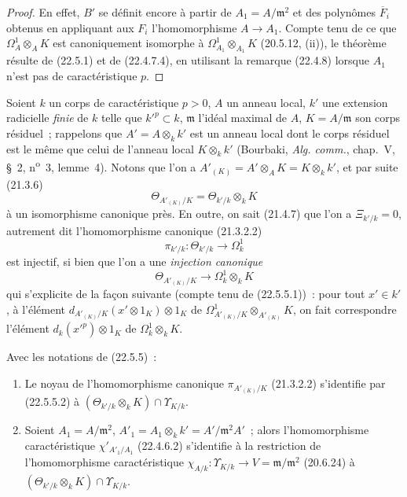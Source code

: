 \begin{proof}
En effet, $B'$ se définit encore à partir de $A_1=A/\mathfrak m^2$ et des
polynômes $\overline F_i$ obtenus en appliquant aux $F_i$ l'homomorphisme
$A\longrightarrow A_1$. Compte tenu de ce que $\Omega^1_A\otimes_AK$ est
canoniquement isomorphe à $\Omega^1_{A_1}\otimes_{A_1}K$ (20.5.12, (ii)), le
théorème résulte de (22.5.1) et de (22.4.7.4), en utilisant la remarque
(22.4.8) lorsque $A_1$ n'est pas de caractéristique $p$.
\end{proof}


\begin{env}[22.5.5]
\label{0.22.5.5-fr}
Soient $k$ un corps de caractéristique $p>0$, $A$ un anneau local, $k'$ une
extension radicielle \emph{finie} de $k$ telle que $k'^p\subset k$,
$\mathfrak m$ l'idéal maximal de $A$, $K=A/\mathfrak m$ son corps résiduel~;
rappelons que $A'=A\otimes_kk'$ est un anneau local dont le corps résiduel est
le même que celui de l'anneau local $K\otimes_kk'$ (Bourbaki,
\emph{Alg. comm.}, chap.~V, §~2, n\textsuperscript{o}~3, lemme~4). Notons que
l'on a $A'_{(K)}=A'\otimes_AK=K\otimes_kk'$, et par suite (21.3.6)
\begin{equation}
\label{0.22.5.5.1-fr}
  \Theta_{A'_{(K)}/K}=\Theta_{k'/k}\otimes_kK
  \tag{22.5.5.1}
\end{equation}
à un isomorphisme canonique près. En outre, on sait (21.4.7) que l'on a
$\Xi_{k'/k}=0$, autrement dit l'homomorphisme canonique (21.3.2.2)
\[
  \pi_{k'/k}:\Theta_{k'/k}\longrightarrow\Omega^1_k
\]
est injectif, si bien que l'on a une \emph{injection canonique}
\begin{equation}
\label{0.22.5.5.2-fr}
  \Theta_{A'_{(K)}/K}\longrightarrow\Omega^1_k\otimes_kK
  \tag{22.5.5.2}
\end{equation}
qui s'explicite de la façon suivante (compte tenu de (22.5.5.1))~: pour tout
$x'\in k'$, à l'élément
$d_{A'_{(K)}/K}(x'\otimes1_K)\otimes1_K$ de
$\Omega^1_{A'_{(K)}/K}\otimes_{A'_{(K)}}K$, on fait correspondre l'élément
$d_k(x'^p)\otimes1_K$ de $\Omega^1_k\otimes_kK$.
\end{env}

\begin{lemma}[22.5.6]
\label{0.22.5.6-fr}
Avec les notations de \textup{(22.5.5)}~:
\begin{enumerate}
  \item[\rm(i)] Le noyau de l'homomorphisme canonique
  $\pi_{A'_{(K)}/K}$ \textup{(21.3.2.2)} s'identifie par \textup{(22.5.5.2)} à
  $(\Theta_{k'/k}\otimes_kK)\cap\Upsilon_{K/k}$.
  \item[\rm(ii)] Soient $A_1=A/\mathfrak m^2$,
  $A'_1=A_1\otimes_kk'=A'/\mathfrak m^2A'$~; alors l'homomorphisme
  caractéristique $\chi'_{A'_1/A_1}$ \textup{(22.4.6.2)} s'identifie à la restriction de
  l'homomorphisme caractéristique
  $\chi_{A/k}:\Upsilon_{K/k}\longrightarrow V=\mathfrak m/\mathfrak m^2$
  \textup{(20.6.24)} à $(\Theta_{k'/k}\otimes_kK)\cap\Upsilon_{K/k}$.
\end{enumerate}
\end{lemma}

